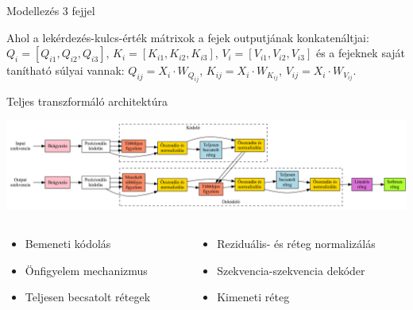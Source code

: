 \documentclass[english, aspectratio=169]{beamer}
\begin{document}
\begin{frame}{Modellezés 3 fejjel}
{\begin{center}
\end{center}}
Ahol a lekérdezés-kulcs-érték mátrixok a fejek outputjának konkatenáltjai: $Q_i = \left[ Q_{i1}, Q_{i2}, Q_{i3} \right]$, $K_i = \left[ K_{i1}, K_{i2}, K_{i3} \right]$, $V_i = \left[ V_{i1}, V_{i2}, V_{i3} \right]$ és a fejeknek saját tanítható súlyai vannak: $Q_{ij} = X_i \cdot W_{Q_{ij}}$, $K_{ij} = X_i \cdot W_{K_{ij}}$, $V_{ij} = X_i \cdot W_{V_{ij}}$.
\end{frame}

\begin{frame}{Teljes transzformáló architektúra}
\begin{center}
\includegraphics[width=14cm, keepaspectratio]{graphs/transformer_25.png}
\end{center}
\begin{columns}
\begin{column}{.5\textwidth}
\begin{itemize}
	\item Bemeneti kódolás
	\item Önfigyelem mechanizmus
	\item Teljesen becsatolt rétegek
\end{itemize}
\end{column}
\begin{column}{.5\textwidth}
\begin{itemize}
	\item Reziduális- és réteg normalizálás 
	\item Szekvencia-szekvencia dekóder
	\item Kimeneti réteg
\end{itemize}
\end{column}
\end{columns}
\end{frame}
\end{document}
